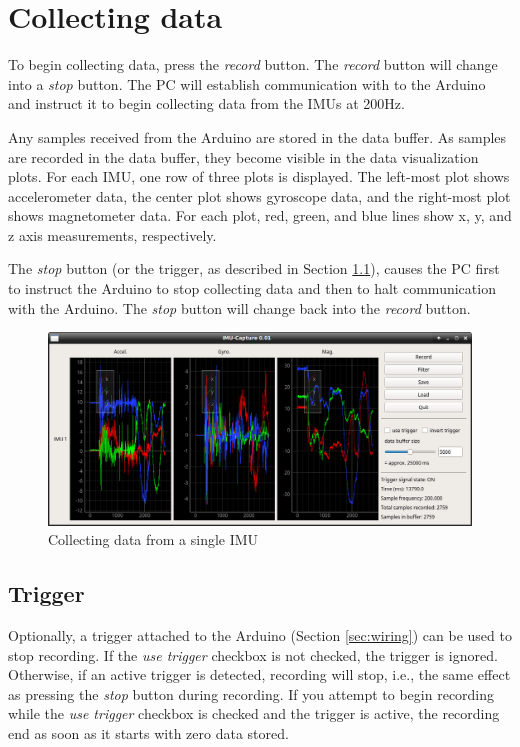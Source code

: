 \documentclass[11pt,letterpaper,article,oneside]{memoir}
\begin{document}
\chapter{Collecting data}

To begin collecting data, press the \emph{record} button.  The \emph{record} button
will change into a \emph{stop} button.  The PC will establish communication with to the
Arduino and instruct it to begin collecting data from the IMUs at 200Hz.

Any samples received from the Arduino are stored in the data buffer. As
samples are recorded in the data buffer, they become visible in the data
visualization plots. For each IMU, one row of three plots is displayed. The
left-most plot shows accelerometer data, the center plot shows gyroscope data,
and the right-most plot shows magnetometer data. For each plot, red, green, and
blue lines show x, y, and z axis measurements, respectively.

The \emph{stop} button (or the trigger, as described in Section \ref{sec:trigger}),
causes the PC first to instruct the Arduino to stop collecting data and then to
halt communication with the Arduino. The \emph{stop} button will change back into the
\emph{record} button.

\begin{figure}[]
    \begin{center}
        \includegraphics[width=\textwidth]{screenshot_plots}
    \end{center}
    \caption{Collecting data from a single IMU} 
\end{figure}



\section{Trigger}
\label{sec:trigger}

Optionally, a trigger attached to the Arduino (Section \ref{sec:wiring}) can be
used to stop recording.  If the \emph{use trigger} checkbox is not checked, the
trigger is ignored. Otherwise, if an active trigger is detected, recording
will stop, i.e., the same effect as pressing the \emph{stop} button during
recording. If you attempt to begin recording while the \emph{use trigger} checkbox
is checked and the trigger is active, the recording end as soon as it starts
with zero data stored.
\end{document}

